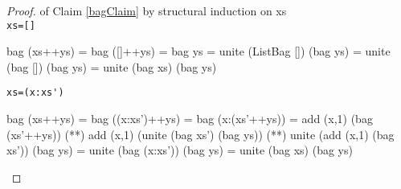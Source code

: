 \begin{proof}of Claim \ref{bagClaim} by structural induction on xs\\
\verb|xs=[]|
\begin{code}
bag (xs++ys) = bag ([]++ys)
             = bag ys
             = unite (ListBag []) (bag ys) 
             = unite (bag []) (bag ys) 
             = unite (bag xs) (bag ys) 
\end{code}
\verb|xs=(x:xs')|
\begin{code}
bag (xs++ys) = bag ((x:xs')++ys)
             = bag (x:(xs'++ys))
             = add (x,1) (bag (xs'++ys))
             (**) add (x,1) (unite (bag xs') (bag ys))
             (*\sEq{\ref{addLemma}}*) unite (add (x,1) (bag xs')) (bag ys)
             = unite (bag (x:xs')) (bag ys)
             = unite (bag xs) (bag ys)
\end{code}
\end{proof}
